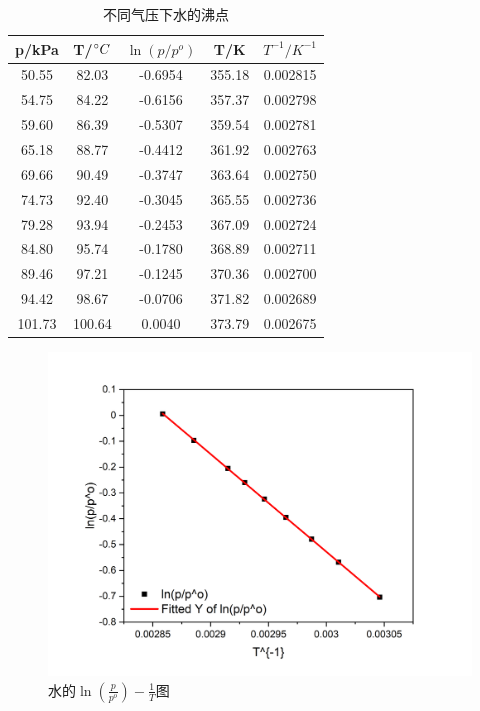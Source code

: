 \documentclass[cn,hazy,pku,12pt,normal,math=newtx,cite=super]{elegantnote}
\begin{document}
\begin{table}[h]
    \centering
    \caption{不同气压下水的沸点}
    \label{04}
    \begin{tabular}{ccccc}
    \hline
    p/kPa  & T/$\degree C$ & $\ln(p/p^o)$ & T/K    & $T^{-1}/K^{-1}$ \\ \hline
    50.55  & 82.03         & -0.6954      & 355.18 & 0.002815        \\
    54.75  & 84.22         & -0.6156      & 357.37 & 0.002798        \\
    59.60  & 86.39         & -0.5307      & 359.54 & 0.002781        \\
    65.18  & 88.77         & -0.4412      & 361.92 & 0.002763        \\
    69.66  & 90.49         & -0.3747      & 363.64 & 0.002750        \\
    74.73  & 92.40         & -0.3045      & 365.55 & 0.002736        \\
    79.28  & 93.94         & -0.2453      & 367.09 & 0.002724        \\
    84.80  & 95.74         & -0.1780      & 368.89 & 0.002711        \\
    89.46  & 97.21         & -0.1245      & 370.36 & 0.002700        \\
    94.42  & 98.67         & -0.0706      & 371.82 & 0.002689        \\
    101.73 & 100.64        & 0.0040       & 373.79 & 0.002675        \\ \hline
    \end{tabular}
\end{table}

\begin{figure}[htbp]
    \centering
    \includegraphics[width = .70\textwidth]{image/Graph4.png}
    \caption{水的$\ln(\frac{p}{p^o}) - \frac{1}{T}$图}\label{4}
\end{figure}
\end{document}
